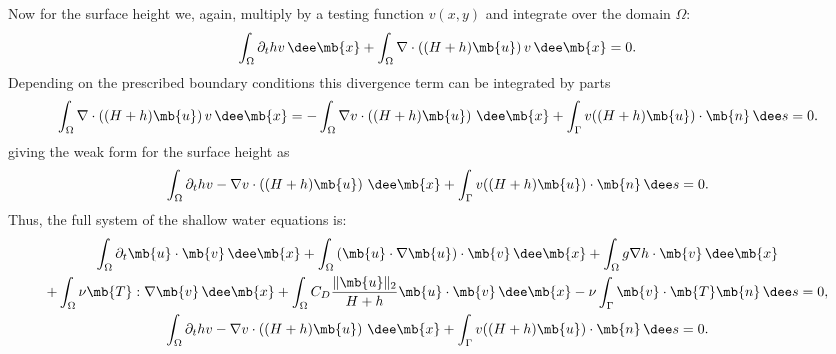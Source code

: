 \documentclass[11pt]{article}
\begin{document}
Now for the surface height we, again, multiply by a testing function $v(x, y)$
and integrate over the domain $\Omega$:
\[
  \int_\Omega \partial_t h v \, \dee \mb{x}
  + \int_\Omega \nabla \cdot \left( (H + h) \mb{u} \right) v \, \dee \mb{x} = 0.
\]
Depending on the prescribed boundary conditions this divergence term can be
integrated by parts
\[
  \int_\Omega \nabla \cdot \left( (H + h) \mb{u} \right) v \, \dee \mb{x}
  = - \int_\Omega \nabla v \cdot \left( (H + h) \mb{u} \right) \, \dee \mb{x}
  + \int_\Gamma v ((H + h) \mb{u}) \cdot \mb{n} \, \dee s = 0.
\]
giving the weak form for the surface height as
\[
  \int_\Omega \partial_t h v
   - \nabla v \cdot \left( (H + h) \mb{u} \right) \, \dee \mb{x}
  + \int_\Gamma v ((H + h) \mb{u}) \cdot \mb{n} \, \dee s = 0.
\]
Thus, the full system of the shallow water equations is:
\begin{gather*}
  \int_\Omega \partial_t \mb{u} \cdot \mb{v} \, \dee \mb{x}
  + \int_\Omega \left(\mb{u} \cdot \nabla \mb{u}\right) \cdot \mb{v} \, \dee \mb{x}
  + \int_\Omega g \nabla h \cdot \mb{v} \, \dee \mb{x} \\
  + \int_\Omega \nu \mb{T} : \nabla \mb{v} \, \dee \mb{x}
  + \int_\Omega C_D \frac{\lVert \mb{u} \rVert_2}{H + h} \mb{u} \cdot \mb{v} \, \dee \mb{x}
  - \nu \int_\Gamma \mb{v} \cdot \mb{T} \mb{n} \, \dee s = 0, \\
  \int_\Omega \partial_t h v
  - \nabla v \cdot \left( (H + h) \mb{u} \right) \, \dee \mb{x}
  + \int_\Gamma v ((H + h) \mb{u}) \cdot \mb{n} \, \dee s = 0.
\end{gather*}

\newpage
\end{document}

